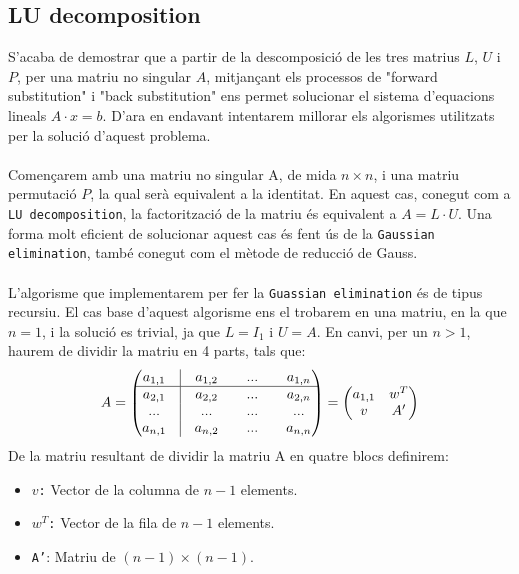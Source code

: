 \documentclass{article}
\begin{document}
\subsection{LU decomposition}
    S'acaba de demostrar que a partir de la descomposició de les tres matrius $L$, $U$ i $P$, per una matriu no singular $A$, mitjançant els processos de "forward substitution" i "back substitution" ens permet solucionar el sistema d'equacions lineals $A \cdot x = b$. D'ara en endavant intentarem millorar els algorismes utilitzats per la solució d'aquest problema. \\ \\
    Començarem amb una matriu no singular A, de mida $n\times n$, i una matriu permutació $P$, la qual serà equivalent a la identitat. En aquest cas, conegut com a \texttt{LU decomposition}, la factorització de la matriu és equivalent a $A = L \cdot U$. Una forma molt eficient de solucionar aquest cas és fent ús de la \texttt{Gaussian elimination}, també conegut com el mètode de reducció de Gauss. \\ \\
    L'algorisme que implementarem per fer la \texttt{Guassian elimination} és de tipus recursiu. El cas base d'aquest algorisme ens el trobarem en una matriu, en la que $n = 1$, i la solució es trivial, ja que $L = I_1$ i $U = A$. En canvi, per un $n > 1$, haurem de dividir la matriu en 4 parts, tals que:
    \begin{equation}
        A=\begin{pmatrix}
        a_{1,1} & \vline & a_{1,2} & & ... & & a_{1,n}\\ 
        \hline 
        a_{2,1} & \vline & a_{2,2} & & ... & &  a_{2,n}\\ 
        ... & \vline & ... & & ... & & ...\\ 
        a_{n,1} & \vline & a_{n,2} & & ... & & a_{n,n}
        \end{pmatrix} = \begin{pmatrix}
        a_{1,1} & w^T\\ 
        v & A'
        \end{pmatrix}
    \end{equation}
    De la matriu resultant de dividir la matriu A en quatre blocs definirem:
    \begin{itemize}
        \item \texttt{$v$:} Vector de la columna de $n-1$ elements.
        \item \texttt{$w^T$:} Vector de la fila de $n-1$ elements.
        \item \texttt{A'}: Matriu de $(n-1) \times (n-1)$.
    \end{itemize}
\end{document}
